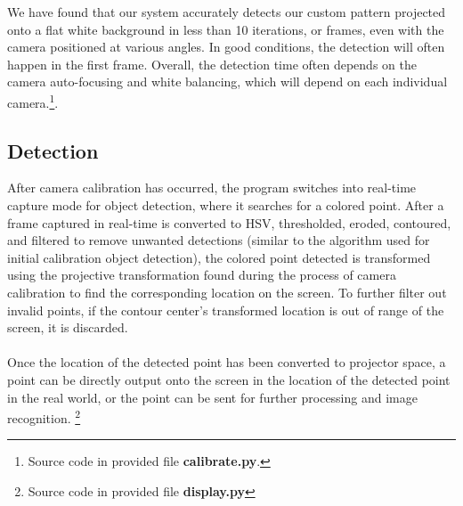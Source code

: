 \documentclass[twoside,twocolumn]{article}
\begin{document}
We have found that our system accurately detects our custom pattern projected onto a flat white background in less than 10 iterations, or frames, even with the camera positioned at various angles. In good conditions, the detection will often happen in the first frame. Overall, the detection time often depends on the camera auto-focusing and white balancing, which will depend on each individual camera.\footnote{Source code in provided file \textbf{calibrate.py}.}.

\subsection{Detection}
After camera calibration has occurred, the program switches into real-time capture mode for object detection, where it searches for a colored point. After a frame captured in real-time is converted to HSV, thresholded, eroded, contoured, and filtered to remove unwanted detections (similar to the algorithm used for initial calibration object detection), the colored point detected is transformed using the projective transformation found during the process of camera calibration to find the corresponding location on the screen. To further filter out invalid points, if the contour center's transformed location is out of range of the screen, it is discarded.\\ \\ Once the location of the detected point has been converted to projector space, a point can be directly output onto the screen in the location of the detected point in the real world, or the point can be sent for further processing and image recognition. \footnote{Source code in provided file \textbf{display.py}}
\end{document}
